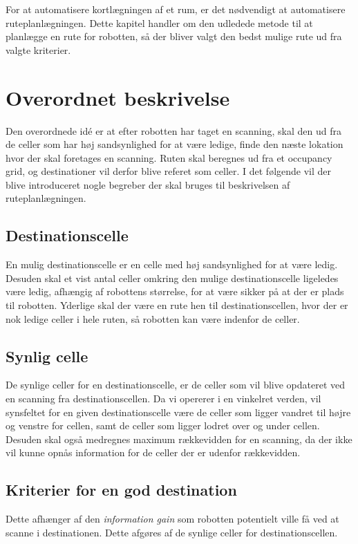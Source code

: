 For at automatisere kortlægningen af et rum, er det nødvendigt at automatisere ruteplanlægningen.
Dette kapitel handler om den udledede metode til at planlægge en rute for robotten, så der bliver valgt den bedst mulige rute ud fra valgte kriterier.

\section{Overordnet beskrivelse}
Den overordnede idé er at efter robotten har taget en scanning, skal den ud fra de celler som har høj sandsynlighed for at være ledige, finde den næste lokation hvor der skal foretages en scanning.
Ruten skal beregnes ud fra et occupancy grid, og destinationer vil derfor blive referet som celler.
I det følgende vil der blive introduceret nogle begreber der skal bruges til beskrivelsen af ruteplanlægningen.

\subsection{Destinationscelle}\label{rute:destinationscelle}
En mulig destinationscelle er en celle med høj sandsynlighed for at være ledig.
Desuden skal et vist antal celler omkring den mulige destinationscelle ligeledes være ledig, afhængig af robottens størrelse, for at være sikker på at der er plads til robotten.
Yderlige skal der være en rute hen til destinationscellen, hvor der er nok ledige celler i hele ruten, så robotten kan være indenfor de celler.

\subsection{Synlig celle}\label{rute:synligcelle}
De synlige celler for en destinationscelle, er de celler som vil blive opdateret ved en scanning fra destinationscellen.
Da vi opererer i en vinkelret verden, vil synsfeltet for en given destinationscelle være de celler som ligger vandret til højre og venstre for cellen, samt de celler som ligger lodret over og under cellen.
Desuden skal også medregnes maximum rækkevidden for en scanning, da der ikke vil kunne opnås information for de celler der er udenfor rækkevidden.

\subsection{Kriterier for en god destination}
Dette afhænger af den \textit{information gain} som robotten potentielt ville få ved at scanne i destinationen.
Dette afgøres af de synlige celler for destinationscellen.

